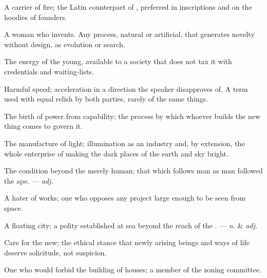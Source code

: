  A carrier of fire; the Latin counterpart of , preferred in inscriptions and on the hoodies of founders.

  A woman who invents.   Any process, natural or artificial, that generates novelty without design, as evolution or search.

 The energy of the young, available to a society that does not tax it with credentials and waiting-lists. 

 Harmful speed; acceleration in a direction the speaker disapproves of. A term used with equal relish by both parties, rarely of the same things.

 The birth of power from capability; the process by which whoever builds the new thing comes to govern it.

 The manufacture of light; illumination as an industry and, by extension, the whole enterprise of making the dark places of the earth and sky bright.

 The condition beyond the merely human; that which follows man as man followed the ape. ---  \textit{adj.}

 A hater of works; one who opposes any project large enough to be seen from space.

 A floating city; a polity established at sea beyond the reach of the . ---  \textit{n.} \& \textit{adj.}

 Care for the new; the ethical stance that newly arising beings and ways of life deserve solicitude, not suspicion.

  One who would forbid the building of houses; a member of the zoning committee.

